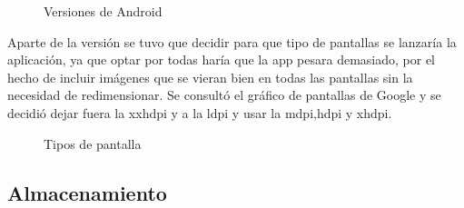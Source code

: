 \begin{figure}[H] 
  \begin{center} 
    \caption{Versiones de Android} 
    \label{fig:VersionesAndroid} 
  \end{center} 
\end{figure}

Aparte de la versión se tuvo que decidir para que tipo de pantallas se lanzaría la aplicación, ya que optar por todas haría que la app pesara demasiado, por el hecho de incluir imágenes que se vieran bien en todas las pantallas sin la necesidad de redimensionar.
Se consultó el gráfico de pantallas de Google y se decidió dejar fuera la xxhdpi y a la ldpi y usar la mdpi,hdpi y xhdpi.

\begin{figure}[H] 
  \begin{center} 
    \caption{Tipos de pantalla} 
    \label{fig:TiposPantalla} 
  \end{center} 
\end{figure}

\subsection{Almacenamiento}
\label{subsecc:Almacenamiento}

